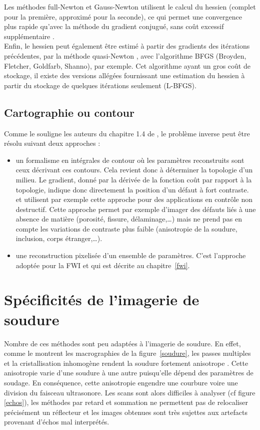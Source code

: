 Les méthodes full-Newton et Gauss-Newton utilisent le calcul du hessien (complet pour la première, approximé pour la seconde), ce qui permet une convergence plus rapide qu'avec la méthode du gradient conjugué, sans coût excessif supplémentaire \citep{pratt_98}.\\

Enfin, le hessien peut également être estimé à partir des gradients des itérations précédentes, par la méthode quasi-Newton \citep{nocedal}, avec l'algorithme BFGS (Broyden, Fletcher, Goldfarb, Shanno), par exemple. Cet algorithme ayant un gros coût de stockage, il existe des versions allégées fournissant une estimation du hessien à partir du stockage de quelques itérations seulement (L-BFGS). 
\subsection{Cartographie ou contour}
Comme le souligne les auteurs du chapitre 1.4 de \cite{mat_ac}, le problème inverse peut être résolu suivant deux approches : 
\begin{itemize}
	\item un formalisme en intégrales de contour où les paramètres reconstruits sont ceux décrivant ces contours. Cela revient donc à déterminer la topologie d'un milieu. Le gradient, donné par la dérivée de la fonction coût par rapport à la topologie, indique donc directement la position d'un défaut à fort contraste. \cite{dominguez} et \cite{rodriguez} utilisent par exemple cette approche pour des applications en contrôle non destructif. Cette approche permet par exemple d'imager des défauts liés à une absence de matière (porosité, fissure, délaminage,\ldots) mais ne prend pas en compte les variations de contraste plus faible (anisotropie de la soudure, inclusion, corps étranger,\ldots).
	\item une reconstruction pixelisée d'un ensemble de paramètres. C'est l'approche adoptée pour la FWI et qui est décrite au chapitre~\ref{fwi}.
\end{itemize}




\section{Spécificités de l'imagerie de soudure}

Nombre de ces méthodes sont peu adaptées à l'imagerie de soudure. En effet, comme le montrent les macrographies de la figure~\ref{soudure}, les passes multiples et la cristallisation inhomogène rendent la soudure fortement anisotrope \citep{chassignole}. Cette anisotropie varie d'une soudure à une autre puisqu'elle dépend des paramètres de soudage. En conséquence, cette anisotropie engendre une courbure voire une division du faisceau ultrasonore. Les scans sont alors difficiles à analyser (cf figure \ref{echos}), les méthodes par retard et sommation ne permettent pas de relocaliser précisément un réflecteur et les images obtenues sont très sujettes aux artefacts provenant d'échos mal interprétés.

